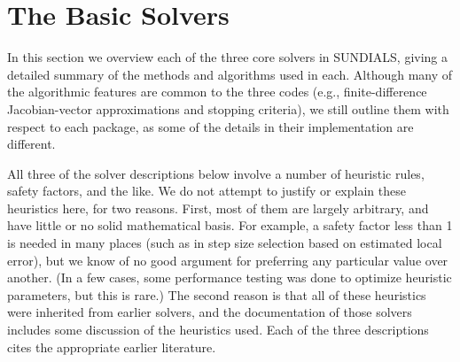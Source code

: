 \section{The Basic Solvers}\label{s:basic_solvers}

In this section we overview each of the three core solvers in
SUNDIALS, giving a detailed summary of the methods and algorithms used
in each.  Although many of the algorithmic features are common to the
three codes (e.g., finite-difference Jacobian-vector approximations
and stopping criteria), we still outline them with respect to each
package, as some of the details in their implementation are different.

All three of the solver descriptions below involve a number of
heuristic rules, safety factors, and the like.  We do not attempt to
justify or explain these heuristics here, for two reasons.  First,
most of them are largely arbitrary, and have little or no solid
mathematical basis.  For example, a safety factor less than 1 is
needed in many places (such as in step size selection based on
estimated local error), but we know of no good argument for preferring
any particular value over another.  (In a few cases, some performance
testing was done to optimize heuristic parameters, but this is rare.)
The second reason is that all of these heuristics were inherited from
earlier solvers, and the documentation of those solvers includes some
discussion of the heuristics used.  Each of the three descriptions
cites the appropriate earlier literature.
